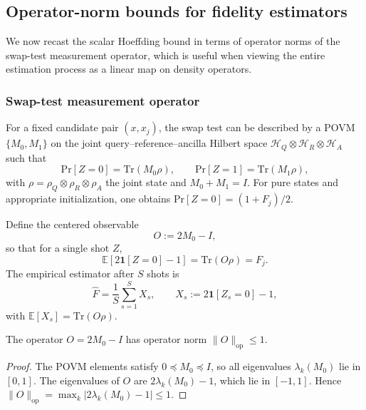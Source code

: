 \documentclass[11pt]{article}
\begin{document}
\subsection{Operator-norm bounds for fidelity estimators}
\label{app:operator-norm}

We now recast the scalar Hoeffding bound in terms of operator norms of
the swap-test measurement operator, which is useful when viewing the
entire estimation process as a linear map on density operators.

\subsubsection{Swap-test measurement operator}

For a fixed candidate pair \((x,x_j)\), the swap test can be described
by a POVM \(\{M_0, M_1\}\) on the joint query--reference--ancilla
Hilbert space \(\mathcal{H}_Q \otimes \mathcal{H}_R \otimes \mathcal{H}_A\)
such that
\begin{equation}
  \mathrm{Pr}[Z=0]
  =
  \mathrm{Tr}(M_0 \rho),
  \qquad
  \mathrm{Pr}[Z=1]
  =
  \mathrm{Tr}(M_1 \rho),
\end{equation}
with \(\rho = \rho_Q \otimes \rho_R \otimes \rho_A\) the joint state and
\(M_0 + M_1 = I\).
For pure states and appropriate initialization, one obtains
\(\mathrm{Pr}[Z=0] = (1+F_j)/2\).

Define the centered observable
\begin{equation}
  O
  :=
  2 M_0 - I,
\end{equation}
so that for a single shot \(Z\),
\begin{equation}
  \mathbb{E}[2\mathbf{1}[Z=0]-1]
  =
  \mathrm{Tr}(O \rho)
  =
  F_j.
\end{equation}
The empirical estimator after \(S\) shots is
\begin{equation}
  \hat{F}
  =
  \frac{1}{S} \sum_{s=1}^S X_s,
  \qquad
  X_s := 2\mathbf{1}[Z_s=0]-1,
\end{equation}
with \(\mathbb{E}[X_s] = \mathrm{Tr}(O\rho)\).

\begin{lemma}
\label{lem:op-norm}
The operator \(O = 2M_0 - I\) has operator norm
\(\|O\|_{\mathrm{op}} \le 1\).
\end{lemma}

\begin{proof}
The POVM elements satisfy \(0 \preceq M_0 \preceq I\), so all
eigenvalues \(\lambda_k(M_0)\) lie in \([0,1]\).
The eigenvalues of \(O\) are \(2\lambda_k(M_0) - 1\), which lie in
\([-1,1]\).
Hence \(\|O\|_{\mathrm{op}} = \max_k |2\lambda_k(M_0)-1| \le 1\).
\end{proof}
\end{document}
